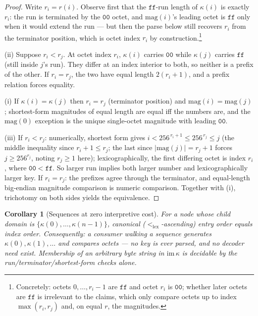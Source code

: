 \documentclass[11pt]{article}
\newtheorem{corollary}[theorem]{Corollary}
\theoremstyle{definition}
\newcommand{\lex}{<_{\mathrm{lex}}}
\newcommand{\magn}{\mathrm{mag}}
\begin{document}
\begin{proof}
Write $r_i = r(i)$. Observe first that the $\mathtt{ff}$-run length of $\kappa(i)$ is
exactly $r_i$: the run is terminated by the $\mathtt{00}$ octet, and $\magn(i)$'s
leading octet is $\mathtt{ff}$ only when it would extend the run --- but then the
parse below still recovers $r_i$ from the terminator position, which is octet
index $r_i$ by construction.\footnote{Concretely: octets $0,\dots,r_i-1$ are
$\mathtt{ff}$ and octet $r_i$ is $\mathtt{00}$; whether later octets are
$\mathtt{ff}$ is irrelevant to the claims, which only compare octets up to index
$\max(r_i, r_j)$ and, on equal $r$, the magnitudes.}

(ii) Suppose $r_i < r_j$. At octet index $r_i$, $\kappa(i)$ carries $\mathtt{00}$
while $\kappa(j)$ carries $\mathtt{ff}$ (still inside $j$'s run). They differ at an
index interior to both, so neither is a prefix of the other. If $r_i = r_j$, the two
have equal length $2(r_i{+}1)$, and a prefix relation forces equality.

(i) If $\kappa(i) = \kappa(j)$ then $r_i = r_j$ (terminator position) and
$\magn(i) = \magn(j)$; shortest-form magnitudes of equal length are equal iff the
numbers are, and the $\magn(0)$ exception is the unique single-octet magnitude with
leading $\mathtt{00}$.

(iii) If $r_i < r_j$: numerically, shortest form gives
$i < 256^{\,r_i+1} \le 256^{\,r_j} \le j$ (the middle inequality since
$r_i + 1 \le r_j$; the last since $|\magn(j)| = r_j{+}1$ forces $j \ge 256^{r_j}$,
noting $r_j \ge 1$ here); lexicographically, the first differing octet is index
$r_i$, where $\mathtt{00} < \mathtt{ff}$. So larger run implies both larger number
and lexicographically larger key. If $r_i = r_j$: the prefixes agree through the
terminator, and equal-length big-endian magnitude comparison is numeric comparison.
Together with (i), trichotomy on both sides yields the equivalence.
\end{proof}

\begin{corollary}[Sequences at zero interpretive cost]\label{cor:pos}
For a node whose child domain is
$\{\kappa(0), \dots, \kappa(n{-}1)\}$, canonical
($\lex$-ascending) entry order equals index order. Consequently: a consumer walking a
sequence generates $\kappa(0), \kappa(1), \dots$ and compares octets --- no key is
ever parsed, and no decoder need exist. Membership of an arbitrary byte string in
$\mathrm{im}\,\kappa$ is decidable by the run/terminator/shortest-form checks alone.
\end{corollary}
\end{document}
